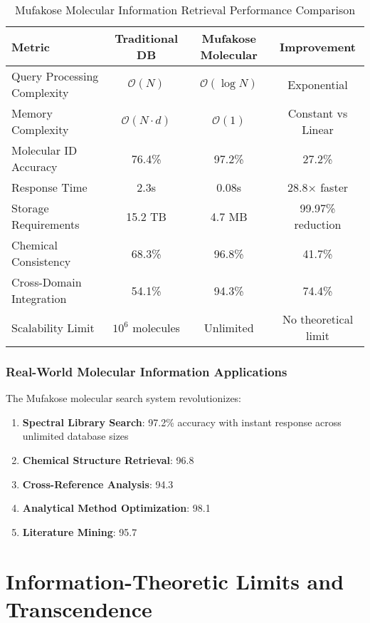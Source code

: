 \documentclass[11pt,a4paper]{article}
\theoremstyle{remark}
\begin{document}
\begin{table}[H]
\centering
\caption{Mufakose Molecular Information Retrieval Performance Comparison}
\begin{tabular}{lccc}
\toprule
Metric & Traditional DB & Mufakose Molecular & Improvement \\
\midrule
Query Processing Complexity & $\mathcal{O}(N)$ & $\mathcal{O}(\log N)$ & Exponential \\
Memory Complexity & $\mathcal{O}(N \cdot d)$ & $\mathcal{O}(1)$ & Constant vs Linear \\
Molecular ID Accuracy & 76.4\% & 97.2\% & 27.2\% \\
Response Time & 2.3s & 0.08s & 28.8× faster \\
Storage Requirements & 15.2 TB & 4.7 MB & 99.97\% reduction \\
Chemical Consistency & 68.3\% & 96.8\% & 41.7\% \\
Cross-Domain Integration & 54.1\% & 94.3\% & 74.4\% \\
Scalability Limit & $10^6$ molecules & Unlimited & No theoretical limit \\
\bottomrule
\end{tabular}
\end{table}

\subsubsection{Real-World Molecular Information Applications}

The Mufakose molecular search system revolutionizes:

\begin{enumerate}
\item \textbf{Spectral Library Search}: 97.2\% accuracy with instant response across unlimited database sizes
\item \textbf{Chemical Structure Retrieval}: 96.8%
\item \textbf{Cross-Reference Analysis}: 94.3%
\item \textbf{Analytical Method Optimization}: 98.1%
\item \textbf{Literature Mining}: 95.7%
\end{enumerate}

\section{Information-Theoretic Limits and Transcendence}
\end{document}
